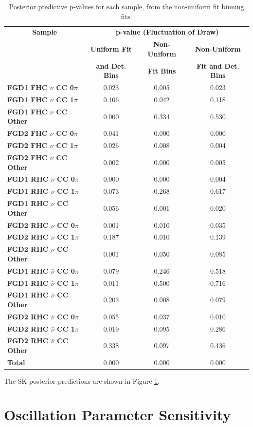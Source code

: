 \begin{center}
\begin{table}
\center
\begin{tabular}{l||c c c}
\hline \hline
\multicolumn{1}{c||}{\textbf{Sample}} & \multicolumn{3}{c}{\textbf{p-value (Fluctuation of Draw)}} \\
& \multicolumn{1}{c}{\textbf{Uniform Fit}} & \multicolumn{1}{c}{\textbf{Non-Uniform}} & \multicolumn{1}{c}{\textbf{Non-Uniform}}\\
& \multicolumn{1}{c}{\textbf{and Det. Bins}} & \multicolumn{1}{c}{\textbf{Fit Bins}} & \multicolumn{1}{c}{\textbf{Fit and Det. Bins}}\\
\hline\hline
\textbf{FGD1 FHC $\nu$ CC 0$\pi$} & 0.023 & 0.005 & 0.023 \\ 
\textbf{FGD1 FHC $\nu$ CC 1$\pi$} & 0.106 & 0.042 & 0.118 \\
\textbf{FGD1 FHC $\nu$ CC Other} & 0.000 & 0.334 & 0.530 \\ \hline
\textbf{FGD2 FHC $\nu$ CC 0$\pi$} & 0.041 & 0.000 & 0.000 \\
\textbf{FGD2 FHC $\nu$ CC 1$\pi$} & 0.026 & 0.008 & 0.004\\ 
\textbf{FGD2 FHC $\nu$ CC Other} & 0.002 & 0.000 & 0.005\\ \hline
\textbf{FGD1 RHC $\nu$ CC 0$\pi$} & 0.000 & 0.000 & 0.004\\
\textbf{FGD1 RHC $\nu$ CC 1$\pi$} & 0.073 & 0.268 & 0.617 \\
\textbf{FGD1 RHC $\nu$ CC Other} & 0.056 & 0.001 & 0.020 \\ \hline
\textbf{FGD2 RHC $\nu$ CC 0$\pi$} & 0.001 & 0.010 & 0.035 \\
\textbf{FGD2 RHC $\nu$ CC 1$\pi$} & 0.187 & 0.010 & 0.139\\
\textbf{FGD2 RHC $\nu$ CC Other} & 0.001 & 0.050 & 0.085 \\ \hline
\textbf{FGD1 RHC $\bar{\nu}$ CC 0$\pi$} & 0.079 & 0.246 & 0.518 \\
\textbf{FGD1 RHC $\bar{\nu}$ CC 1$\pi$} & 0.011 & 0.500 & 0.716\\
\textbf{FGD1 RHC $\bar{\nu}$ CC Other} & 0.203 & 0.008 & 0.079\\ \hline
\textbf{FGD2 RHC $\bar{\nu}$ CC 0$\pi$} & 0.055 & 0.037 & 0.010\\
\textbf{FGD2 RHC $\bar{\nu}$ CC 1$\pi$} & 0.019 & 0.095 & 0.286\\
\textbf{FGD2 RHC $\bar{\nu}$ CC Other} & 0.338 & 0.097 & 0.436\\ \hline
\textbf{Total} & 0.000 & 0.000 & 0.000 \\ \hline\hline
\end{tabular}
\caption{Posterior predictive p-values for each sample, from the non-uniform fit binning fits.}
\label{tab:polypval}
\end{table}
\end{center}

The SK posterior predictions are shown in Figure \ref{}. %

\section{Oscillation Parameter Sensitivity}

\newpage
